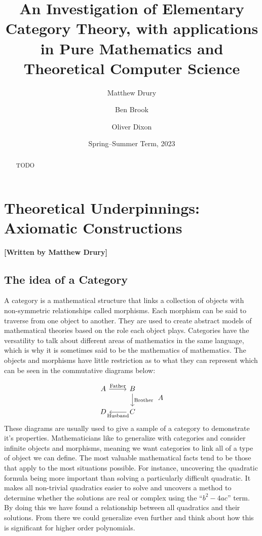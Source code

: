 \documentclass[10pt,a4paper,reqno]{amsart}
\title[An Investigation of Elementary Category Theory]{An Investigation of %
        Elementary Category Theory, with applications in Pure Mathematics and %
        Theoretical Computer Science}
\author{Matthew Drury} \email{\yorkemail{md1499}}
\author{Ben Brook}     \email{\yorkemail{bb1170}}
\author{Oliver Dixon}  \email{\yorkemail{od641}}
\date{Spring--Summer Term, 2023}
\numberwithin{figure}{section}
\begin{document}
\begin{abstract}
        TODO
\end{abstract}
\maketitle
\tableofcontents
\section{Theoretical %
        Underpinnings: Axiomatic Constructions}
\begin{flushright}
        \textbf{[Written by Matthew Drury]}
\end{flushright}


\subsection{The idea of a Category}
A category is a mathematical structure that links a collection of objects with
non-symmetric relationships called morphisms.  Each morphism can be said to
traverse from one object to another.  They are used to create abstract models of
mathematical theories based on the role each object plays.  Categories have the
versatility to talk about different areas of mathematics in the same language,
which is why it is sometimes said to be the mathematics of mathematics.   The
objects and morphisms have little restriction as to what they can represent
which can be seen in the commutative diagrams below:

\begin{equation}
        \begin{tikzcd}[ampersand replacement=\&]
                A
                        \ar[r,"\text{Father}"] \&
                B
                        \ar[d,"\text{Brother}"] \\
                D \&
                C \ar[l,"\text{Husband}"]
        \end{tikzcd}
        \begin{tikzcd}
        A
        \end{tikzcd}
\end{equation}
These diagrams are usually used to give a sample of a category to demonstrate
it's properties.  Mathematicians like to generalize with categories and consider
infinite objects and morphisms, meaning we want categories to link all of a type
of object we can define.   The most valuable mathematical facts tend to be those
that apply to the most situations possible.  For instance, uncovering the
quadratic formula being more important than solving a particularly difficult
quadratic.  It makes all non-trivial quadratics easier to solve and uncovers a
method to determine whether the solutions are real or complex using the
``$b^2-4ac$'' term.   By doing this we have found a relationship between all
quadratics and their solutions.   From there we could generalize even further
and think about how this is significant for higher order polynomials.
\end{document}
